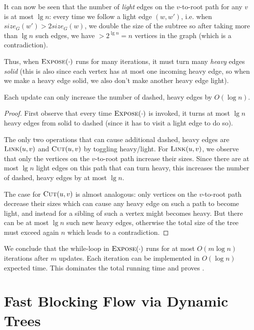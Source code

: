 It can now be seen that the number of \emph{light} edges on the $v$-to-root path for any $v$ is at most $\lg n$: every time we follow a light edge $(w,w')$, i.e. when $size_G(w') > 2 size_G(w)$, we double the size of the subtree so after taking more than $\lg n$ such edges, we have $> 2^{\lg n} = n$ vertices in the graph (which is a contradiction).

Thus, when $\textsc{Expose}(\cdot)$ runs for many iterations, it must turn many \emph{heavy} edges \emph{solid} (this is also since each vertex has at most one incoming heavy edge, so when we make a heavy edge solid, we also don't make another heavy edge light). 

\begin{claim}
Each update can only increase the number of dashed, heavy edges by $O(\log n)$. 
\end{claim}
\begin{proof}
First observe that every time $\textsc{Expose}(\cdot)$ is invoked, it turns at most $\lg n$ heavy edges from solid to dashed (since it has to visit a light edge to do so).

The only two operations that can cause additional dashed, heavy edges are $\textsc{Link}(u,v)$ and $\textsc{Cut}(u,v)$ by toggling heavy/light. For $\textsc{Link}(u,v)$, we observe that only the vertices on the $v$-to-root path increase their sizes. Since there are at most $\lg n$ light edges on this path that can turn heavy, this increases the number of dashed, heavy edges by at most $\lg n$. 

The case for $\textsc{Cut}(u,v)$ is almost analogous: only vertices on the $v$-to-root path decrease their sizes which can cause any heavy edge on such a path to become light, and instead for a sibling of such a vertex might becomes heavy. But there can be at most $\lg n$ such new heavy edges, otherwise the total size of the tree must exceed again $n$ which leads to a contradiction.
\end{proof}

We conclude that the while-loop in $\textsc{Expose}(\cdot)$ runs for at most $O(m \log n)$ iterations after $m$ updates. Each iteration can be implemented in $O(\log n)$ expected time. This dominates the total running time and proves .

\section{Fast Blocking Flow via Dynamic Trees}

